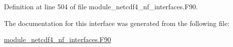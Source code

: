 Definition at line 504 of file module\+\_\+netcdf4\+\_\+nf\+\_\+interfaces.\+F90.



The documentation for this interface was generated from the following file\+:\begin{DoxyCompactItemize}
\item 
\hyperlink{module__netcdf4__nf__interfaces_8F90}{module\+\_\+netcdf4\+\_\+nf\+\_\+interfaces.\+F90}\end{DoxyCompactItemize}
